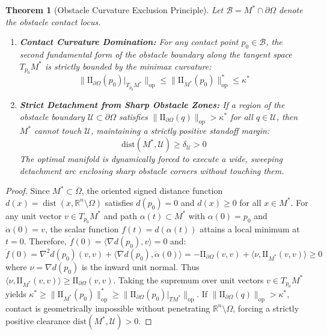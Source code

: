 \documentclass[11pt,reqno]{amsart}
\newtheorem{theorem}{Theorem}[section]
\theoremstyle{definition}
\providecommand{\R}{\mathbb{R}}
\providecommand{\II}{\mathrm{I\!I}}
\newcommand{\op}{\mathrm{op}}
\newcommand{\dist}{\mathrm{dist}}
\numberwithin{equation}{section}
\providecommand{\II}{\mathrm{II}}
\providecommand{\R}{\mathbb{R}}
\begin{document}
\begin{theorem}[Obstacle Curvature Exclusion Principle]
\label{thm:obstacle_exclusion}
Let $\mathcal{B} = M^* \cap \partial\Omega$ denote the obstacle contact locus. 
\begin{enumerate}
    \item \textbf{Contact Curvature Domination:} For any contact point $p_0 \in \mathcal{B}$, the second fundamental form of the obstacle boundary along the tangent space $T_{p_0}M^*$ is strictly bounded by the minimax curvature:
    \begin{equation}
    \|\II_{\partial\Omega}(p_0)|_{T_{p_0}M^*}\|_{\op} \le \|\II_{M^*}(p_0)\|_{\op}^* \le \kappa^*
    \end{equation}
    \item \textbf{Strict Detachment from Sharp Obstacle Zones:} If a region of the obstacle boundary $\mathcal{U} \subset \partial\Omega$ satisfies $\|\II_{\partial\Omega}(q)\|_{\op} > \kappa^*$ for all $q \in \mathcal{U}$, then $M^*$ cannot touch $\mathcal{U}$, maintaining a strictly positive standoff margin:
    \begin{equation}
    \dist(M^*, \mathcal{U}) \ge \delta_{\mathcal{U}} > 0
    \end{equation}
    The optimal manifold is dynamically forced to execute a wide, sweeping detachment arc enclosing sharp obstacle corners without touching them.
\end{enumerate}
\end{theorem}

\begin{proof}
Since $M^* \subset \bar{\Omega}$, the oriented signed distance function $d(x) = \operatorname{dist}(x, \R^n \setminus \Omega)$ satisfies $d(p_0) = 0$ and $d(x) \ge 0$ for all $x \in M^*$. For any unit vector $v \in T_{p_0}M^*$ and path $\alpha(t) \subset M^*$ with $\alpha(0) = p_0$ and $\dot{\alpha}(0) = v$, the scalar function $f(t) = d(\alpha(t))$ attains a local minimum at $t=0$. Therefore, $\dot{f}(0) = \langle \nabla d(p_0), v \rangle = 0$ and:
\begin{equation}
\ddot{f}(0) = \nabla^2 d(p_0)(v, v) + \langle \nabla d(p_0), \ddot{\alpha}(0) \rangle = -\II_{\partial\Omega}(v, v) + \langle \nu, \II_{M^*}(v, v) \rangle \ge 0
\end{equation}
where $\nu = \nabla d(p_0)$ is the inward unit normal. Thus $\langle \nu, \II_{M^*}(v, v) \rangle \ge \II_{\partial\Omega}(v, v)$. Taking the supremum over unit vectors $v \in T_{p_0}M^*$ yields $\kappa^* \ge \|\II_{M^*}(p_0)\|_{\op}^* \ge \|\II_{\partial\Omega}(p_0)|_{T M^*}\|_{\op}$. If $\|\II_{\partial\Omega}(q)\|_{\op} > \kappa^*$, contact is geometrically impossible without penetrating $\R^n \setminus \Omega$, forcing a strictly positive clearance $\dist(M^*, \mathcal{U}) > 0$.
\end{proof}
\end{document}
